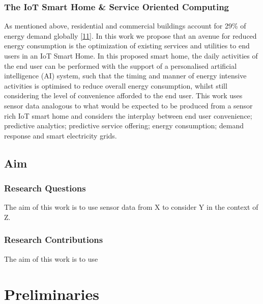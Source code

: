 \documentclass[11pt,]{article}
\begin{document}
\hypertarget{the-iot-smart-home-service-oriented-computing}{%
\subsubsection{The IoT Smart Home \& Service Oriented
Computing}\label{the-iot-smart-home-service-oriented-computing}}

As mentioned above, residential and commercial buildings account for
29\% of energy demand globally
{[}\protect\hyperlink{ref-Consumption}{11}{]}. In this work we propose
that an avenue for reduced energy consumption is the optimization of
existing services and utilities to end users in an IoT Smart Home. In
this proposed smart home, the daily activities of the end user can be
performed with the support of a personalised artificial intelligence
(AI) system, such that the timing and manner of energy intensive
activities is optimised to reduce overall energy consumption, whilst
still considering the level of convenience afforded to the end user.
This work uses sensor data analogous to what would be expected to be
produced from a sensor rich IoT smart home and considers the interplay
between end user convenience; predictive analytics; predictive service
offering; energy consumption; demand response and smart electricity
grids.

\hypertarget{aim}{%
\subsection{Aim}\label{aim}}

\hypertarget{research-questions}{%
\subsubsection{Research Questions}\label{research-questions}}

The aim of this work is to use sensor data from X to consider Y in the
context of Z.

\hypertarget{research-contributions}{%
\subsubsection{Research Contributions}\label{research-contributions}}

The aim of this work is to use

\pagebreak

\hypertarget{preliminaries}{%
\section{Preliminaries}\label{preliminaries}}
\end{document}
